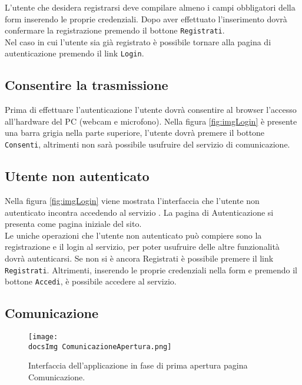 {{L’utente che desidera registrarsi deve compilare almeno i campi obbligatori della form inserendo le proprie credenziali. Dopo aver effettuato l’inserimento dovrà confermare la registrazione premendo il bottone \texttt{Registrati}.\\ %
Nel caso in cui l’utente sia già registrato è possibile tornare alla pagina di autenticazione premendo il link \texttt{Login}.
}

\subsection{Consentire la trasmissione}{
Prima di effettuare l'autenticazione l’utente dovrà consentire al browser l’accesso all’hardware del PC (webcam e microfono). Nella figura \ref{fig:imgLogin} è presente una barra grigia nella parte superiore, l'utente dovrà premere il bottone \texttt{Consenti}, altrimenti non sarà possibile usufruire del servizio di comunicazione.
}

\subsection{Utente non autenticato}\label{utNoAutent}{
Nella figura \ref{fig:imgLogin} viene mostrata l'interfaccia che l'utente non autenticato incontra accedendo al servizio \textbf{\mytalk}.
La pagina di Autenticazione si presenta come pagina iniziale del sito.\\
Le uniche operazioni che l'utente non autenticato può compiere sono la registrazione e il login al servizio, per poter usufruire delle altre funzionalità dovrà autenticarsi.
Se non si è ancora Registrati è possibile premere il link \texttt{Registrati}. Altrimenti, inserendo le proprie credenziali nella form e premendo il bottone \texttt{Accedi}, è possibile accedere al servizio.
}

\newpage

\subsection{Comunicazione}\label{comunicazione}{
\begin{figure}[h!]
	\centering
		\texttt{[image: \\docsImg ComunicazioneApertura.png]}
		\caption{Interfaccia dell'applicazione in fase di prima apertura pagina Comunicazione.} 
		\label{fig:imgComAp}
	\end{figure}

}}
